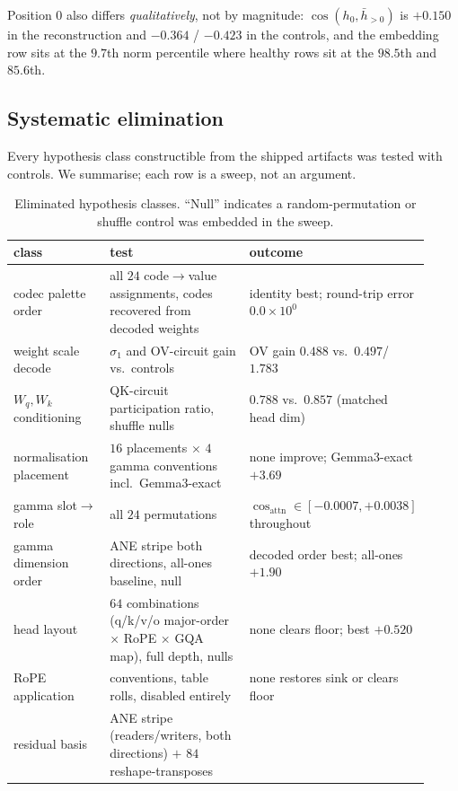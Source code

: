 Position $0$ also differs \emph{qualitatively}, not by magnitude: $\cos(h_0, \bar h_{>0})$ is
$+0.150$ in the reconstruction and $-0.364$ / $-0.423$ in the controls, and the 
embedding row sits at the $9.7$th norm percentile where healthy  rows sit at the
$98.5$th and $85.6$th.

\subsection{Systematic elimination}\label{sec:gap-basis}

Every hypothesis class constructible from the shipped artifacts was tested with controls. We
summarise; each row is a sweep, not an argument.

\begin{table}[h]
\centering\small
\caption{Eliminated hypothesis classes. ``Null'' indicates a random-permutation or shuffle control
was embedded in the sweep.}
\begin{tabular}{>{\raggedright\arraybackslash}p{0.25\linewidth}>{\raggedright\arraybackslash}p{0.41\linewidth}>{\raggedright\arraybackslash}p{0.26\linewidth}}
\toprule
class & test & outcome \\
\midrule
codec palette order & all $24$ code$\to$value assignments, codes recovered from decoded weights
& identity best; round-trip error $0.0\times10^{0}$ \\
weight scale decode & $\sigma_1$ and OV-circuit gain vs.\ controls
& OV gain $0.488$ vs.\ $0.497$/$1.783$ \\
$W_q,W_k$ conditioning & QK-circuit participation ratio, shuffle nulls
& $0.788$ vs.\ $0.857$ (matched head dim) \\
normalisation placement & $16$ placements $\times$ $4$ gamma conventions incl.\ Gemma3-exact
& none improve; Gemma3-exact $+3.69$ \\
gamma slot$\to$role & all $24$ permutations
& $\cos_{\mathrm{attn}}\in[-0.0007,+0.0038]$ throughout \\
gamma dimension order & ANE stripe both directions, all-ones baseline, null
& decoded order best; all-ones $+1.90$ \\
head layout & $64$ combinations (q/k/v/o major-order $\times$ RoPE $\times$ GQA map), full depth, nulls
& none clears floor; best $+0.520$ \\
RoPE application & conventions, table rolls, disabled entirely
& none restores sink or clears floor \\
residual basis & ANE stripe (readers/writers, both directions) $+$ $84$ reshape-transposes

\end{tabular}
\end{table}
